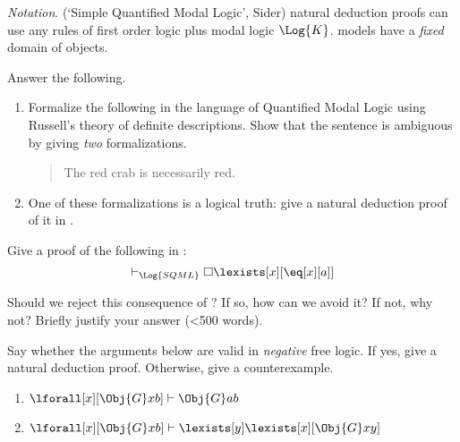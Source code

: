 \documentclass[../../../include/open-logic-section]{subfiles}
\begin{document}

\newpage
{}

\emph{Notation}.  (`Simple Quantified Modal Logic', Sider) 
natural deduction proofs can use any rules of first order logic plus 
modal logic $\Log{K}$.  models have a \emph{fixed} domain of 
objects.

\begin{prob}
    Answer the following.
    \begin{enumerate}
    \item 
    Formalize the following in the language of Quantified Modal Logic 
    using Russell's theory of definite descriptions. Show that the 
    sentence is ambiguous by giving \emph{two} formalizations. 
    \begin{quote}
        The red crab is necessarily red.
    \end{quote}
    

    \item
    One of these formalizations is a logical truth: give a natural 
    deduction proof of it in . 
    \end{enumerate}

\end{prob}

\begin{prob}
    Give a proof of the following in :
    $$\vdash_{\Log{SQML}}\Box\lexists[x][\eq[x][a]]$$
    
    Should we reject this consequence of ? If so, how can
    we avoid it? If not, why not? Briefly justify your answer (<500 words). 

\end{prob}

\begin{prob}
    Say whether the arguments below are valid in \emph{negative} free logic.
    If yes, give a natural deduction proof. Otherwise, 
    give a counterexample.
    \begin{enumerate}
        \item $\lforall[x][\Obj{G}xb] \vdash \Obj{G}ab$
        \item $\lforall[x][\Obj{G}xb] \vdash \lexists[y]\lexists[x][\Obj{G}xy]$
    \end{enumerate}
\end{prob}
\end{document}
